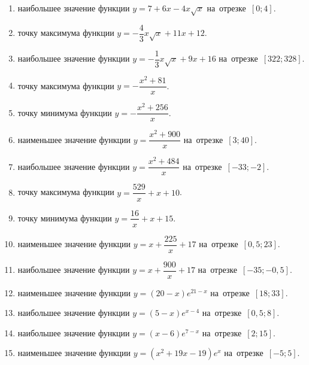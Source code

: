 \documentclass[a4paper,10pt]{article}
\begin{document}
\begin{enumerate}
\item {} наибольшее значение функции $y=7+6x -4x\sqrt{x}$ на~отрезке~$\left[0;4\right]$.

\item {} точку максимума функции $y=-\dfrac{4}{3}x\sqrt{x} +11x+12$.

\item {} наибольшее значение функции $y=-\dfrac{1}{3}x\sqrt{x} +9x+16$ на~отрезке~$\left[322;328\right]$.

\item {} точку максимума функции $y=-\dfrac{x^2 +81}{x}$.

\item {} точку минимума функции $y=-\dfrac{x^2 +256}{x}$.

\item {} наименьшее значение функции $y=\dfrac{x^2 +900}{x}$ на~отрезке~$\left[3;40\right]$.

\item {} наибольшее значение функции $y=\dfrac{x^2 +484}{x}$ на~отрезке~$\left[-33;-2\right]$.

\item {} точку максимума функции $y=\dfrac{529}{x} +x+10$.

\item {} точку минимума функции $y=\dfrac{16}{x} +x+15$.

\item {} наименьшее значение функции $y=x+\dfrac{225}{x} +17$ на~отрезке~$\left[0,5;23\right]$.

\item {} наибольшее значение функции $y=x+\dfrac{900}{x} +17$ на~отрезке~$\left[-35;-0,5\right]$.

\item {} наименьшее значение функции $y=\left(20-x\right)e^{21-x}$ на~отрезке~$\left[18;33\right]$.

\item {} наибольшее значение функции $y=\left(5-x\right)e^{x-4}$ на~отрезке~$\left[0,5;8\right]$.

\item {} наибольшее значение функции $y=\left(x-6\right)e^{7-x}$ на~отрезке~$\left[2;15\right]$.

\item {} наименьшее значение функции $y=\left(x^2 +19x -19\right)e^{x }$ на~отрезке~$\left[-5;5\right]$.


\end{enumerate}
\end{document}
